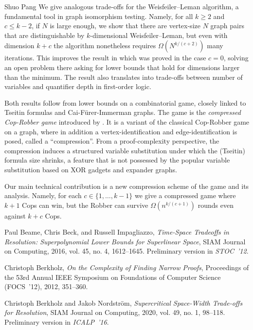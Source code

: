 \documentclass[report]{owrart}
\begin{document}
\begin{report}
\begin{talk}{Shuo Pang}
  We give analogous trade-offs for the Weisfeiler--Leman algorithm, a fundamental tool in graph isomorphism testing. 
  Namely, for all $k\geq 2$ and $c\leq k-2$, if $N$ is large enough, we show that there are vertex-size $N$ graph pairs that are distinguishable by $k$-dimensional Weisfeiler--Leman, but even with dimension $k+c$ the algorithm nonetheless requires $\Omega({N}^{k/(c+2)})$ many iterations. This improves the result in \cite{GLNS23} which was proved in the case $c=0$, solving an open problem there asking for lower bounds that hold for dimensions larger than the minimum.
  The result also translates into trade-offs between number of variables and quantifier depth in first-order logic.
  
  Both results follow from lower bounds on a combinatorial game, closely linked to Tseitin formulas and Cai-F\"urer-Immerman graphs. 
  The game is the \emph{compressed Cop-Robber game} introduced by \cite{GLNS23}. 
  It is a variant of the classical Cop-Robber game on a graph, where in addition a vertex-identification and edge-identification is posed, called a ``compression''.  
  From a proof-complexity perspective, the compression induces a structured variable substitution under which the (Tseitin) formula size shrinks, a feature that is not possessed by the popular variable substitution based on XOR gadgets and expander graphs.
  
  Our main technical contribution is a new compression scheme of the game and its analysis. 
  Namely, for each $c\in\{1,\ldots, k-1\}$ we give a compressed game where $k+1$ Cops can win, but the Robber can survive $\Omega(n^{k/(c+1)})$ rounds even against $k+c$ Cops. 
  
  
  \begin{thebibliography}{99}
  Paul Beame, Chris Beck, and Russell Impagliazzo, \textit{Time-Space Tradeoffs in Resolution: Superpolynomial Lower Bounds for Superlinear Space}, SIAM Journal on Computing, 2016, vol. 45, no. 4, 1612--1645. Preliminary version in \emph{STOC~'12}.
  
  Christoph Berkholz, \textit{On the Complexity of Finding Narrow Proofs}, Proceedings of the 53rd Annual {IEEE} Symposium on Foundations of Computer Science ({FOCS}~'12), 2012, 351--360.
  
  Christoph Berkholz and Jakob Nordström, \textit{Supercritical Space-Width Trade-offs for Resolution}, {SIAM Journal on Computing}, 2020, vol. 49, no. 1, 98--118. Preliminary version in \emph{ICALP~'16}.
  

\end{thebibliography}
\end{talk}
\end{report}
\end{document}
